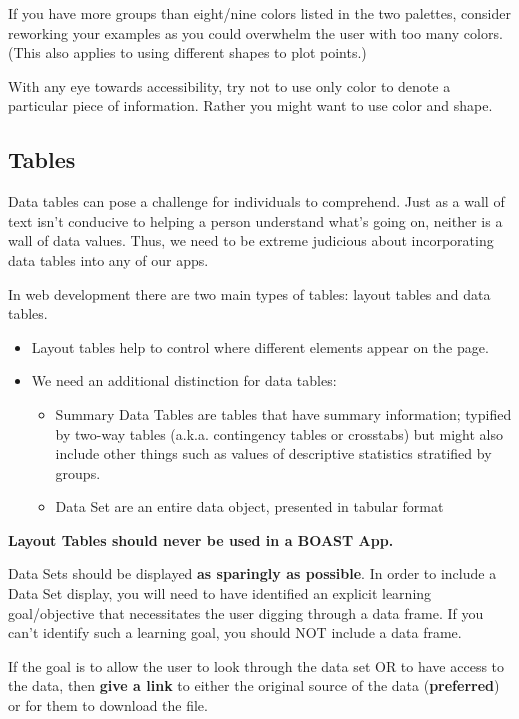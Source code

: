\documentclass[
]{book}
\providecommand{\tightlist}{%
  \setlength{\itemsep}{0pt}\setlength{\parskip}{0pt}}
\begin{document}
If you have more groups than eight/nine colors listed in the two palettes, consider reworking your examples as you could overwhelm the user with too many colors. (This also applies to using different shapes to plot points.)

With any eye towards accessibility, try not to use only color to denote a particular piece of information. Rather you might want to use color and shape.

\hypertarget{tables}{%
\subsection{Tables}\label{tables}}

Data tables can pose a challenge for individuals to comprehend. Just as a wall of text isn't conducive to helping a person understand what's going on, neither is a wall of data values. Thus, we need to be extreme judicious about incorporating data tables into any of our apps.

In web development there are two main types of tables: layout tables and data tables.

\begin{itemize}
\tightlist
\item
  Layout tables help to control where different elements appear on the page.
\item
  We need an additional distinction for data tables:

  \begin{itemize}
  \tightlist
  \item
    Summary Data Tables are tables that have summary information; typified by two-way tables (a.k.a. contingency tables or crosstabs) but might also include other things such as values of descriptive statistics stratified by groups.
  \item
    Data Set are an entire data object, presented in tabular format
  \end{itemize}
\end{itemize}

\textbf{Layout Tables should never be used in a BOAST App.}

Data Sets should be displayed \textbf{as sparingly as possible}. In order to include a Data Set display, you will need to have identified an explicit learning goal/objective that necessitates the user digging through a data frame. If you can't identify such a learning goal, you should NOT include a data frame.

If the goal is to allow the user to look through the data set OR to have access to the data, then \textbf{give a link} to either the original source of the data (\textbf{preferred}) or for them to download the file.
\end{document}
